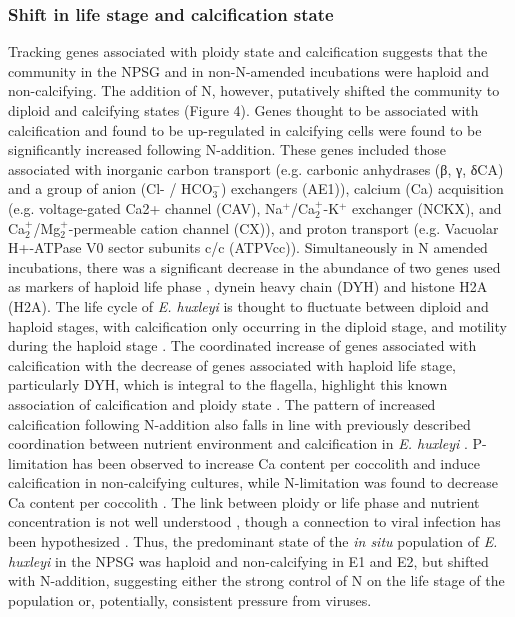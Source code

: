 \subsubsection{Shift in life stage and calcification state}

Tracking genes associated with ploidy state and calcification suggests that the community in the NPSG and in non-N-amended incubations were haploid and non-calcifying. The addition of N, however, putatively shifted the community to diploid and calcifying states (Figure 4). Genes thought to be associated with calcification \citep{Mackinder2010} and found to be up-regulated in calcifying cells \citep{Mackinder2011} were found to be significantly increased following N-addition. These genes included those associated with inorganic carbon transport (e.g. carbonic anhydrases (β, γ, δCA) and a group of anion (Cl- / HCO$_{3}^-$) exchangers (AE1)), calcium (Ca) acquisition (e.g. voltage-gated Ca2+ channel (CAV), Na$^+$/Ca$_{2}^+$-K$^+$ exchanger (NCKX), and Ca$_{2}^+$/Mg$_{2}^+$-permeable cation channel (CX)), and proton transport (e.g. Vacuolar H+-ATPase V0 sector subunits c/c (ATPVcc)). Simultaneously in N amended incubations, there was a significant decrease in the abundance of two genes used as markers of haploid life phase \citep{Frada2012}, dynein heavy chain (DYH) and histone H2A (H2A). The life cycle of \textit{E. huxleyi} is thought to fluctuate between diploid and haploid stages, with calcification only occurring in the diploid stage, and motility during the haploid stage \citep{Paasche2001}. The coordinated increase of genes associated with calcification with the decrease of genes associated with haploid life stage, particularly DYH, which is integral to the flagella, highlight this known association of calcification and ploidy state \citep{Frada2012}. The pattern of increased calcification following N-addition also falls in line with previously described coordination between nutrient environment and calcification in \textit{E. huxleyi} \citep{Paasche2001}. P-limitation has been observed to increase Ca content per coccolith and induce calcification in non-calcifying cultures, while N-limitation was found to decrease Ca content per coccolith \citep{Paasche1994, Paasche1998}. The link between ploidy or life phase and nutrient concentration is not well understood \citep{Green1996}, though a connection to viral infection has been hypothesized \citep{Frada2008}. Thus, the predominant state of the \textit{in situ} population of \textit{E. huxleyi} in the NPSG was haploid and non-calcifying in E1 and E2, but shifted with N-addition, suggesting either the strong control of N on the life stage of the population or, potentially, consistent pressure from viruses. 

